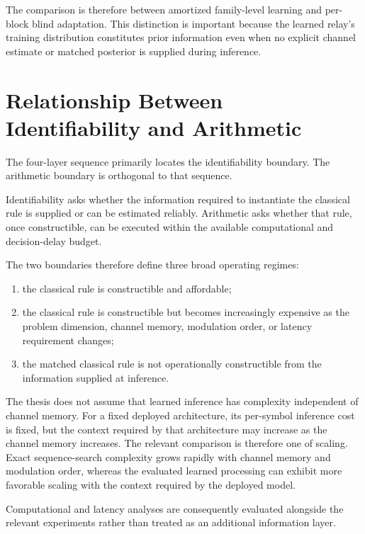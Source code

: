 The comparison is therefore between amortized family-level learning and
per-block blind adaptation. This distinction is important because the learned
relay's training distribution constitutes prior information even when no
explicit channel estimate or matched posterior is supplied during inference.


\section{Relationship Between Identifiability and Arithmetic}
\label{sec:identifiability-arithmetic}

The four-layer sequence primarily locates the identifiability boundary. The
arithmetic boundary is orthogonal to that sequence.

Identifiability asks whether the information required to instantiate the
classical rule is supplied or can be estimated reliably. Arithmetic asks
whether that rule, once constructible, can be executed within the available
computational and decision-delay budget.

The two boundaries therefore define three broad operating regimes:

\begin{enumerate}
    \item the classical rule is constructible and affordable;

    \item the classical rule is constructible but becomes increasingly
    expensive as the problem dimension, channel memory, modulation order, or
    latency requirement changes;

    \item the matched classical rule is not operationally constructible from
    the information supplied at inference.
\end{enumerate}

The thesis does not assume that learned inference has complexity independent
of channel memory. For a fixed deployed architecture, its per-symbol inference
cost is fixed, but the context required by that architecture may increase as
the channel memory increases. The relevant comparison is therefore one of
scaling. Exact sequence-search complexity grows rapidly with channel memory
and modulation order, whereas the evaluated learned processing can exhibit
more favorable scaling with the context required by the deployed model.

Computational and latency analyses are consequently evaluated alongside the
relevant experiments rather than treated as an additional information layer.


